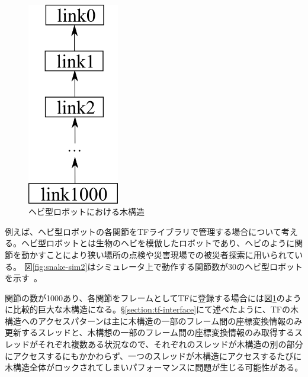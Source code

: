 \documentclass[a4paper]{jreport}	%
\begin{document}
\begin{figure}[h] 
\centering
\includegraphics[width=4cm]{snake}	
\caption{ヘビ型ロボットにおける木構造}
\label{fig:snake}
\end{figure}


例えば、ヘビ型ロボットの各関節をTFライブラリで管理する場合について考える。ヘビ型ロボットとは生物のヘビを模倣したロボットであり、ヘビのように関節を動かすことにより狭い場所の点検や災害現場での被災者探索に用いられている。
図\ref{fig:snake-sim2}はシミュレータ上で動作する関節数が30のヘビ型ロボットを示す~\cite{snake-sim}。

関節の数が1000あり、各関節をフレームとしてTFに登録する場合には図\ref{fig:snake}のように比較的巨大な木構造になる。§\ref{section:tf-interface}にて述べたように、TFの木構造へのアクセスパターンは主に木構造の一部のフレーム間の座標変換情報のみ更新するスレッドと、木構想の一部のフレーム間の座標変換情報のみ取得するスレッドがそれぞれ複数ある状況なので、それぞれのスレッドが木構造の別の部分にアクセスするにもかかわらず、一つのスレッドが木構造にアクセスするたびに木構造全体がロックされてしまいパフォーマンスに問題が生じる可能性がある。
\end{document}
